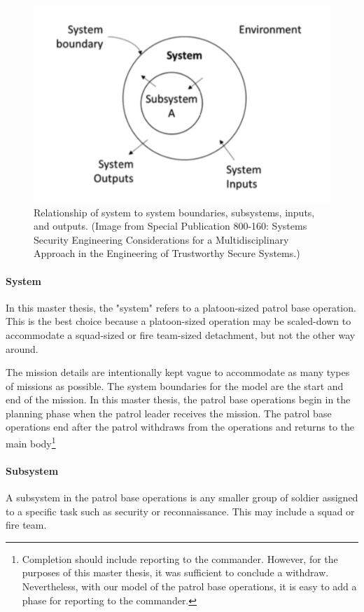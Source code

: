 \documentclass[../../main/main.tex]{subfiles}
\begin{document}
\begin{figure}[h]
\includegraphics[width=\linewidth]{../figures/system}
\caption{\label{system}Relationship of system to system boundaries, subsystems, inputs, and outputs. (Image from  Special Publication 800-160: Systems Security Engineering Considerations for a Multidisciplinary Approach in the Engineering of Trustworthy Secure Systems.)}
\end{figure}
\paragraph*{System}
In this master thesis, the "system" refers to a platoon-sized patrol base operation.  This is the best choice because a platoon-sized operation may be scaled-down to accommodate a squad-sized or fire team-sized detachment, but not the other way around. 

The mission details are intentionally kept vague to accommodate as many types of missions as possible.  The system boundaries for the model are the start and end of the mission. In this master thesis, the patrol base operations begin in the planning phase when the patrol leader receives the mission.  The patrol base operations end after the patrol withdraws from the operations and returns to the main body\footnote{Completion should include reporting to the commander.  However, for the purposes of this master thesis, it was sufficient to conclude a withdraw.  Nevertheless, with our model of the patrol base operations, it is easy to add a phase for reporting to the commander.}

\paragraph*{Subsystem}
A subsystem in the patrol base operations is any smaller group of soldier assigned to a specific task such as security or reconnaissance.  This may include a squad or fire team.  
\end{document}
